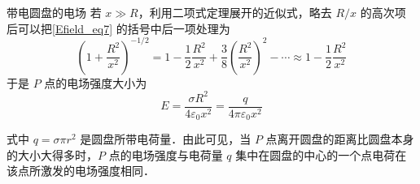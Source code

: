 \begin{example}{带电圆盘的电场}
若 $x\gg R$，利用二项式定理展开的近似式，略去 $R/x$ 的高次项后可以把\autoref{Efield_eq7} 的括号中后一项处理为
\begin{equation}
\left(1+\frac{R^{2}}{x^{2}}\right)^{-1 / 2}=1-\frac{1}{2} \frac{R^{2}}{x^{2}}+\frac{3}{8}\left(\frac{R^{2}}{x^{2}}\right)^{2}-\cdots \approx 1-\frac{1}{2} \frac{R^{2}}{x^{2}}
\end{equation}
于是 $P$ 点的电场强度大小为
\begin{equation}
E=\frac{\sigma R^{2}}{4 \varepsilon_{0} x^{2}} =\frac{q}{4 \pi \varepsilon_{0} x^{2}} 
\end{equation}

式中 $q=\sigma\pi r^2$ 是圆盘所带电荷量．由此可见，当 $P$ 点离开圆盘的距离比圆盘本身的大小大得多时，$ P$ 点的电场强度与电荷量 $q$ 集中在圆盘的中心的一个点电荷在该点所激发的电场强度相同．
\end{example}
